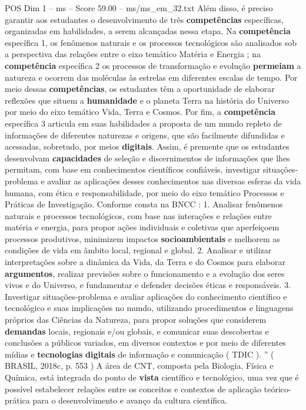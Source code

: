 \begin{textsample}{POS Dim 1 – ms – Score 59.00 – ms/ms\_em\_32.txt}
Além disso, é preciso garantir aos estudantes o desenvolvimento de três \textbf{competências} específicas, organizadas em habilidades, a serem alcançadas nessa etapa.
Na \textbf{competência} específica 1, os fenômenos naturais e os processos tecnológicos são analisados sob a perspectiva das relações entre o eixo temático Matéria e Energia ; na \textbf{competência} específica 2 os processos de transformação e evolução \textbf{permeiam} a natureza e ocorrem das moléculas às estrelas em diferentes escalas de tempo.
Por meio dessas \textbf{competências}, os estudantes têm a oportunidade de elaborar reflexões que situem a \textbf{humanidade} e o planeta Terra na história do Universo por meio do eixo temático Vida, Terra e Cosmos.
Por fim, a \textbf{competência} específica 3 articula em suas habilidades a proposta de um mundo repleto de informações de diferentes naturezas e origens, que são facilmente difundidas e acessadas, sobretudo, por meios \textbf{digitais}.
Assim, é premente que os estudantes desenvolvam \textbf{capacidades} de seleção e discernimentos de informações que lhes permitam, com base em conhecimentos científicos confiáveis, investigar situações-problema e avaliar as aplicações desses conhecimentos nas diversas esferas da vida humana, com ética e responsabilidade, por meio do eixo temático Processos e Práticas de Investigação.
Conforme consta na BNCC : 1.
Analisar fenômenos naturais e processos tecnológicos, com base nas interações e relações entre matéria e energia, para propor ações individuais e coletivas que aperfeiçoem processos produtivos, minimizem impactos \textbf{socioambientais} e melhorem as condições de vida em âmbito local, regional e global. 2.
Analisar e utilizar interpretações sobre a dinâmica da Vida, da Terra e do Cosmos para elaborar \textbf{argumentos}, realizar previsões sobre o funcionamento e a evolução dos seres vivos e do Universo, e fundamentar e defender decisões éticas e responsáveis. 3.
Investigar situações-problema e avaliar aplicações do conhecimento científico e tecnológico e suas implicações no mundo, utilizando procedimentos e linguagens próprios das Ciências da Natureza, para propor soluções que considerem \textbf{demandas} locais, regionais e/ou globais, e comunicar suas descobertas e conclusões a públicos variados, em diversos contextos e por meio de diferentes mídias e \textbf{tecnologias} \textbf{digitais} de informação e comunicação ( TDIC ). ” ( BRASIL, 2018c, p. 553 ) A área de CNT, composta pela Biologia, Física e Química, está integrada do ponto de \textbf{vista} científico e tecnológico, uma vez que é possível estabelecer relações entre os conceitos e contextos de aplicação teórico-prática para o desenvolvimento e avanço da cultura científica.

\end{textsample}
